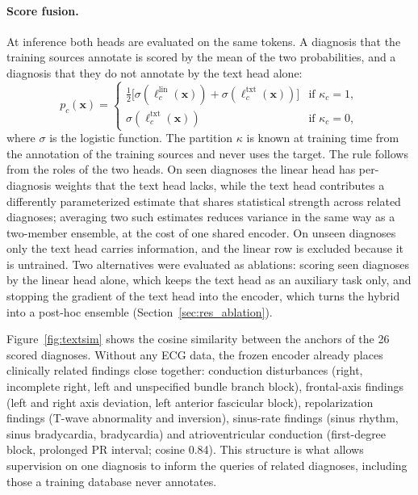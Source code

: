 \paragraph{Score fusion.}
At inference both heads are evaluated on the same tokens. A diagnosis that the training sources annotate is scored by the mean of the two probabilities, and a diagnosis that they do not annotate by the text head alone:
\begin{equation}
p_c(\mathbf{x})=
\begin{cases}
\tfrac12\big[\sigma(\ell^{\mathrm{lin}}_c(\mathbf{x}))+\sigma(\ell^{\mathrm{txt}}_c(\mathbf{x}))\big] & \text{if } \kappa_c=1,\\[2pt]
\sigma(\ell^{\mathrm{txt}}_c(\mathbf{x})) & \text{if } \kappa_c=0,
\end{cases}
\label{eq:fusion}
\end{equation}
where $\sigma$ is the logistic function. The partition $\kappa$ is known at training time from the annotation of the training sources and never uses the target. The rule follows from the roles of the two heads. On seen diagnoses the linear head has per-diagnosis weights that the text head lacks, while the text head contributes a differently parameterized estimate that shares statistical strength across related diagnoses; averaging two such estimates reduces variance in the same way as a two-member ensemble, at the cost of one shared encoder. On unseen diagnoses only the text head carries information, and the linear row is excluded because it is untrained. Two alternatives were evaluated as ablations: scoring seen diagnoses by the linear head alone, which keeps the text head as an auxiliary task only, and stopping the gradient of the text head into the encoder, which turns the hybrid into a post-hoc ensemble (Section~\ref{sec:res_ablation}).

Figure~\ref{fig:textsim} shows the cosine similarity between the anchors of the 26 scored diagnoses. Without any ECG data, the frozen encoder already places clinically related findings close together: conduction disturbances (right, incomplete right, left and unspecified bundle branch block), frontal-axis findings (left and right axis deviation, left anterior fascicular block), repolarization findings (T-wave abnormality and inversion), sinus-rate findings (sinus rhythm, sinus bradycardia, bradycardia) and atrioventricular conduction (first-degree block, prolonged PR interval; cosine 0.84). This structure is what allows supervision on one diagnosis to inform the queries of related diagnoses, including those a training database never annotates.

